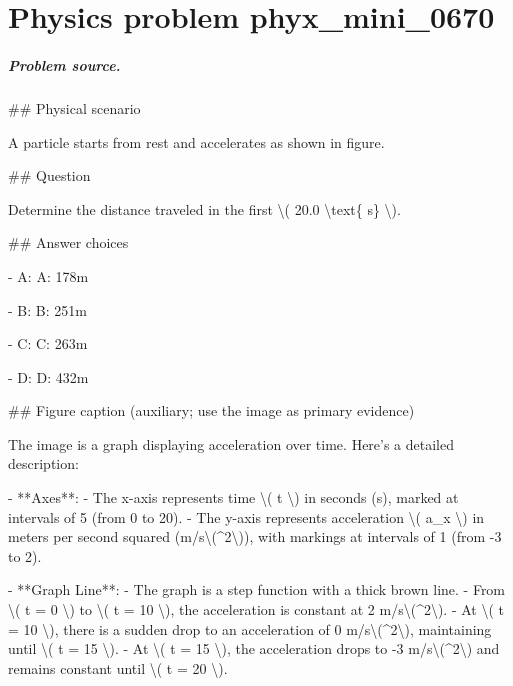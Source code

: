 
\chapter{Physics problem phyx\_mini\_0670}
\label{ch:PhyXMiniProblems_problem_phyx_mini_0670}

\paragraph{Problem source.}
\#\# Physical scenario

A particle starts from rest and accelerates as shown in figure.

\#\# Question

Determine the distance traveled in the first \textbackslash{}( 20.0 \textbackslash{}text\{ s\} \textbackslash{}).

\#\# Answer choices

- A: A: 178m

- B: B: 251m

- C: C: 263m

- D: D: 432m

\#\# Figure caption (auxiliary; use the image as primary evidence)

The image is a graph displaying acceleration over time. Here's a detailed description:

- **Axes**: 
  - The x-axis represents time \textbackslash{}( t \textbackslash{}) in seconds (s), marked at intervals of 5 (from 0 to 20).
  - The y-axis represents acceleration \textbackslash{}( a\_x \textbackslash{}) in meters per second squared (m/s\textbackslash{}(\textasciicircum{}2\textbackslash{})), with markings at intervals of 1 (from -3 to 2).

- **Graph Line**: 
  - The graph is a step function with a thick brown line.
  - From \textbackslash{}( t = 0 \textbackslash{}) to \textbackslash{}( t = 10 \textbackslash{}), the acceleration is constant at 2 m/s\textbackslash{}(\textasciicircum{}2\textbackslash{}).
  - At \textbackslash{}( t = 10 \textbackslash{}), there is a sudden drop to an acceleration of 0 m/s\textbackslash{}(\textasciicircum{}2\textbackslash{}), maintaining until \textbackslash{}( t = 15 \textbackslash{}).
  - At \textbackslash{}( t = 15 \textbackslash{}), the acceleration drops to -3 m/s\textbackslash{}(\textasciicircum{}2\textbackslash{}) and remains constant until \textbackslash{}( t = 20 \textbackslash{}).

